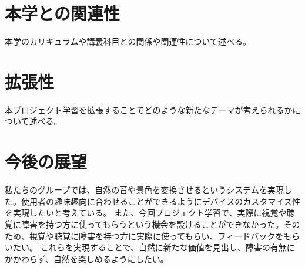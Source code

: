 \section{本学との関連性}
本学のカリキュラムや講義科目との関係や関連性について述べる。

\section{拡張性}
本プロジェクト学習を拡張することでどのような新たなテーマが考えられるかについて述べる。

\section{今後の展望}私たちのグループでは、自然の音や景色を変換させるというシステムを実現した。使用者の趣味趣向に合わせることができるようにデバイスのカスタマイズ性を実現したいと考えている。
また、今回プロジェクト学習で、実際に視覚や聴覚に障害を持つ方に使ってもらうという機会を設けることができなかった。そのため、視覚や聴覚に障害を持つ方に実際に使ってもらい、フィードバックをもらいたい。
これらを実現することで、自然に新たな価値を見出し、障害の有無にかかわらず、自然を楽しめるようにしたい。  

\newpage\clearpage
\vspace*{-20pt}
\printbibliography[segment=\therefsegment,heading=subbibliography]
